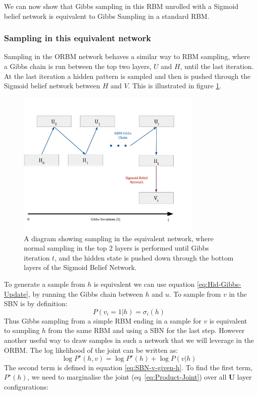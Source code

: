 We can now show that Gibbs sampling in this RBM unrolled with a Sigmoid belief network is equivalent to Gibbs Sampling in a standard RBM.\@

\subsubsection{Sampling in this equivalent network}

Sampling in the ORBM network behaves a similar way to RBM sampling, where a Gibbs chain is run between the top two layers, $U$ and $H$, until the last iteration. At the last iteration a hidden pattern is sampled and then is pushed through the Sigmoid belief network between $H$ and $V$. This is illustrated in figure \ref{F:3-Layer-RBM-Gibbs}.

\begin{figure}[h]
\begin{center}
  \includegraphics[width = 0.8\textwidth]{Assets/ORBM-Gibbs-Chain.png}
\caption{A diagram showing sampling in the equivalent network, where normal sampling in the top 2 layers is performed until Gibbs iteration $t$, and the hidden state is pushed down through the bottom layers of the Sigmoid Belief Network.}
\label{F:3-Layer-RBM-Gibbs}
\end{center}
\end{figure}

To generate a sample from $h$ is equivalent we can use equation \ref{eq:Hid-Gibbs-Update}, by running the Gibbs chain between $h$ and $u$. To sample from $v$ in the SBN is by definition:
$$
P(v_i = 1|h) = \sigma_i(h)
$$
Thus Gibbs sampling from a simple RBM ending in a sample for $v$ is equivalent to sampling $h$ from the same RBM and using a SBN for the last step. However another useful way to draw samples in such a network that we will leverage in the ORBM. The log likelihood of the joint can be written as:
\begin{equation}\label{eq:Product-Joint}
\log P^\star(h,v) = \log P^\star(h) + \log P(v|h)
\end{equation}
The second term is defined in equation \ref{eq:SBN-v-given-h}. To find the first term, $P^\star(h)$, we need to marginalise the joint (eq~\ref{eq:Product-Joint}) over all $\mathbf{U}$ layer configurations:


